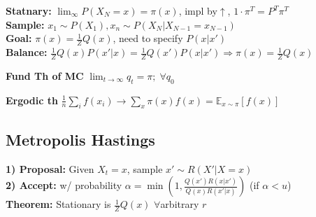 \textbf{Statnary:} $\lim_{\infty} P(X_N = x) = \pi(x)$, impl by$\uparrow$, $1 \cdot \pi^T = P^T \pi^T$\\

\textbf{Sample:} $x_1 \sim P(X_1), x_n \sim P(X_N | X_{N-1} = x_{N-1})$\\

\textbf{Goal:} $\pi(x) = \frac{1}{Z} Q(x)$, need to specify $P(x|x')$\\

\textbf{Balance:} $\frac{1}{Z}Q(x)P(x'|x) = \frac{1}{Z}Q(x')P(x|x') \Rightarrow \pi(x) = \frac{1}{Z}Q(x)$\\
\begin{comment}
Given unnormalized distribution Q(x), we want to design a Markov chain with stationary distribution $\pi$. We can ensure that the stationary distribution is correct if it satisfies the detailed balance equation.\\
	It suffices to show that $P(X_t = x) = \frac{1}{Z}Q(x) \Rightarrow P(X_{t+1} = x) = \frac{1}{Z}Q(x)$.\\ 
	Proof: $P(X_{t+1} = x) = \sum_{x'} P(X_{t+1} = x, X_t = x') \\
	= \sum_{x'} P(X_{t+1} = x| X_t = x') P(X_t = x') \\
	= \sum_{x'} P(X_{t+1} = x| X_t = x') \frac{1}{Z}Q(x')\\
	= \sum_{x'} P(X_{t+1} = x'| X_t = x) \frac{1}{Z}Q(x)\\
	= \frac{1}{Z}Q(x)$\\
\end{comment}

\textbf{Fund Th of MC} $\lim _{t \to \infty } q_t = \pi ; \; \forall q_0$

\textbf{Ergodic th} $\frac{1}{n} \sum_i f(x_i) \rightarrow \sum_{x} \pi (x) f(x) = \mathbb{E}_{x \sim \pi} [f(x)]$

\subsection{Metropolis Hastings}
\textbf{1) Proposal:} Given $X_t=x$, sample $x' \sim R(X' | X=x)$\\
\textbf{2) Accept:} w/ probability $\alpha = \min (1, \frac{Q(x')R(x|x')}{Q(x)R(x'|x)})$ (if $\alpha < u$)\\
\textbf{Theorem:} Stationary is $\frac{1}{Z}Q(x)$ $\forall $arbitrary $r$\\
\begin{comment}
	The performance depends heavily on what we choose as proposal distribution R.\\
\end{comment}

